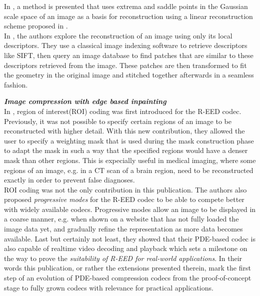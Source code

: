 In \cite{kanters05}, a method is presented that uses extrema and saddle points in the Gaussian
scale space of an image as a basis for reconstruction using a linear reconstruction scheme proposed
in \cite{janssen05}.\\
In \cite{weinzaepfel11}, the authors explore the reconstruction of an image using only its local
descriptors. They use a classical image indexing software to retrieve descriptors like
SIFT\cite{sift}, then query an image database to find patches that are similar to these descriptors
retrieved from the image. These patches are then transformed to fit the geometry in the original
image and stitched together afterwards in a seamless fashion.

\textbf{ \emph{ Image compression with edge based inpainting } }\cite{dong07}\\

In \cite{peter15}, region of interest(ROI) coding was first introduced for the R-EED codec. Previously,
it was not possible to specify certain regions of an image to be reconstructed with higher detail.
With this new contribution, they allowed the user to specify a weighting mask that is used during
the mask construction phase to adapt the mask in such a way that the specified regions would have a
denser mask than other regions. This is expecially useful in medical imaging, where some regions of
an image, e.g. in a CT scan of a brain region, need to be reconstructed exactly in order to prevent
false diagnoses. \\
ROI coding was not the only contribution in this publication. The authors also proposed
\textit{progressive modes} for the R-EED codec to be able to compete better with widely available codecs.
Progressive modes allow an image to be displayed in a coarse manner, e.g. when shown on a website
that has not fully loaded the image data yet, and gradually refine the representation as more data
becomes available. Last but certainly not least, they showed that their PDE-based codec is also
capable of realtime video decoding and playback which sets a milestone on the way to prove the
\textit{suitability of R-EED for real-world applications}\cite{peter15}. In their words this
publication, or rather the extensions presented therein, mark the first step of an evolution of
PDE-based compression codecs from the proof-of-concept stage to fully grown codecs with relevance
for practical applications.\cite{peter15}\\

